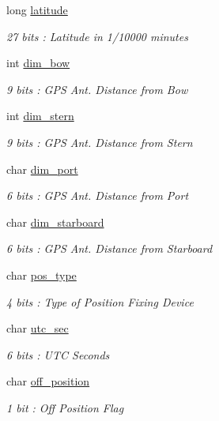 \begin{DoxyCompactItemize}
long \mbox{\hyperlink{structaismsg__21_abd477d0fb604b0594eaa18bb9125d9b3}{latitude}}
\begin{DoxyCompactList}\small\item\em 27 bits \+: Latitude in 1/10000 minutes \end{DoxyCompactList}\item 
int \mbox{\hyperlink{structaismsg__21_ab4842eb80704ca1fb498ce9617c4b62d}{dim\+\_\+bow}}
\begin{DoxyCompactList}\small\item\em 9 bits \+: G\+PS Ant. Distance from Bow \end{DoxyCompactList}\item 
int \mbox{\hyperlink{structaismsg__21_a01c848c97910c1d4cbccee90c390b12b}{dim\+\_\+stern}}
\begin{DoxyCompactList}\small\item\em 9 bits \+: G\+PS Ant. Distance from Stern \end{DoxyCompactList}\item 
char \mbox{\hyperlink{structaismsg__21_ab40b0ddfb33c52f7fe4144ec6debf63f}{dim\+\_\+port}}
\begin{DoxyCompactList}\small\item\em 6 bits \+: G\+PS Ant. Distance from Port \end{DoxyCompactList}\item 
char \mbox{\hyperlink{structaismsg__21_aa1d99282bcf1dd55c6f1abed816e5982}{dim\+\_\+starboard}}
\begin{DoxyCompactList}\small\item\em 6 bits \+: G\+PS Ant. Distance from Starboard \end{DoxyCompactList}\item 
char \mbox{\hyperlink{structaismsg__21_a8501ac816db46d49b3fed3a1ebd0aabe}{pos\+\_\+type}}
\begin{DoxyCompactList}\small\item\em 4 bits \+: Type of Position Fixing Device \end{DoxyCompactList}\item 
char \mbox{\hyperlink{structaismsg__21_a99bfa826d1d9dc4ddfb37a681d3192e1}{utc\+\_\+sec}}
\begin{DoxyCompactList}\small\item\em 6 bits \+: U\+TC Seconds \end{DoxyCompactList}\item 
char \mbox{\hyperlink{structaismsg__21_a7c42f2530eb9c92614904564d316be93}{off\+\_\+position}}
\begin{DoxyCompactList}\small\item\em 1 bit \+: Off Position Flag \end{DoxyCompactList}\item 

\end{DoxyCompactItemize}
